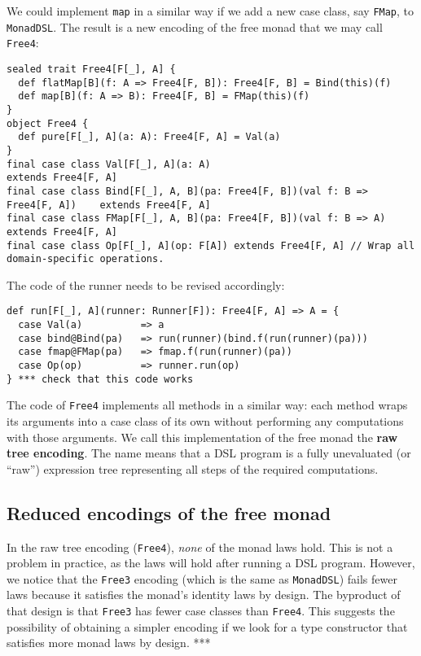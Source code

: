 We could implement \lstinline!map!
in a similar way if we add a new case class, say \lstinline!FMap!,
to \lstinline!MonadDSL!.
The result is a new encoding of the free monad that we may call \lstinline!Free4!:
\begin{lstlisting}
sealed trait Free4[F[_], A] {
  def flatMap[B](f: A => Free4[F, B]): Free4[F, B] = Bind(this)(f)
  def map[B](f: A => B): Free4[F, B] = FMap(this)(f)
}
object Free4 {
  def pure[F[_], A](a: A): Free4[F, A] = Val(a)
}
final case class Val[F[_], A](a: A)                                            extends Free4[F, A]
final case class Bind[F[_], A, B](pa: Free4[F, B])(val f: B => Free4[F, A])    extends Free4[F, A]
final case class FMap[F[_], A, B](pa: Free4[F, B])(val f: B => A)              extends Free4[F, A]
final case class Op[F[_], A](op: F[A]) extends Free4[F, A] // Wrap all domain-specific operations.
\end{lstlisting}
The code of the runner needs to be revised accordingly:
\begin{lstlisting}
def run[F[_], A](runner: Runner[F]): Free4[F, A] => A = {
  case Val(a)          => a
  case bind@Bind(pa)   => run(runner)(bind.f(run(runner)(pa)))
  case fmap@FMap(pa)   => fmap.f(run(runner)(pa))
  case Op(op)          => runner.run(op)
} *** check that this code works
\end{lstlisting}
The code of \lstinline!Free4!
implements all methods in a similar way: each method wraps its arguments
into a case class of its own without performing any computations with
those arguments. We call this implementation of the free monad the
\textbf{raw tree encoding}. The
name means that a DSL program is a fully unevaluated (or \textsf{``}raw\textsf{''})
expression tree representing all steps of the required computations.

\subsection{Reduced encodings of the free monad}

In the raw tree encoding (\lstinline!Free4!),
\emph{none} of the monad laws hold. This is not a problem in practice,
as the laws will hold after running a DSL program. However, we notice
that the \lstinline!Free3!
encoding (which is the same as \lstinline!MonadDSL!)
fails fewer laws because it satisfies the monad\textsf{'}s identity laws by
design. The byproduct of that design is that \lstinline!Free3!
has fewer case classes than \lstinline!Free4!.
This suggests the possibility of obtaining a simpler encoding if we
look for a type constructor that satisfies more monad laws by design.
{*}{*}{*}

